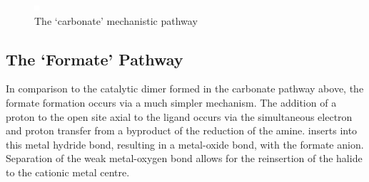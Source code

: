 \begin{figure}[!htb]
 \begin{center}
  \includegraphics[clip=true, width=\textwidth]{images/insertgraphic.eps}
 \end{center}
\caption{The `carbonate' mechanistic pathway}
\label{fig.carbonate}
\end{figure} 

\subsection{The `Formate' Pathway}
In comparison to the catalytic dimer formed in the carbonate pathway above, the formate formation occurs via a much simpler mechanism. The addition of a proton to the open site axial to the ligand occurs via the simultaneous electron and proton transfer from a byproduct of the reduction of the amine.  inserts into this metal hydride bond, resulting in a metal-oxide bond, with the formate anion. Separation of the weak metal-oxygen bond allows for the reinsertion of the halide to the cationic metal centre. 

